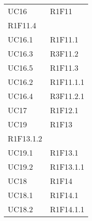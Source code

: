 \begin{longtable}{|C{6.5cm}|C{6.5cm}|}
	UC16 & \centering R1F11 \\ R1F11.4 \tabularnewline
	UC16.1 & R1F11.1 \\
	UC16.3 & R3F11.2 \\
	UC16.5 & R1F11.3 \\
	UC16.2 & R1F11.1.1 \\
	UC16.4 & R3F11.2.1 \\
	UC17 & R1F12.1 \\
	UC19 & \centering R1F13 \\ R1F13.1.2 \tabularnewline
	UC19.1 & R1F13.1 \\
	UC19.2 & R1F13.1.1 \\
	UC18 & R1F14 \\
	UC18.1 & R1F14.1 \\
	UC18.2 & R1F14.1.1 \\

\end{longtable}
